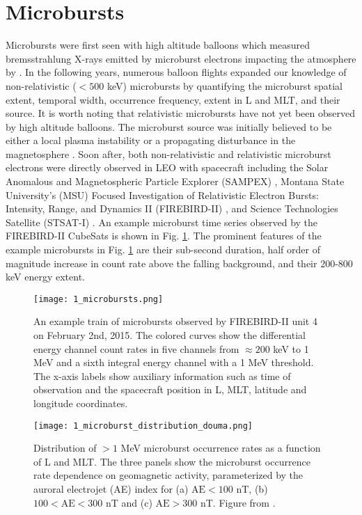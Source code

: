 \section{Microbursts}\label{Intro:microbursts}
Microbursts were first seen with high altitude balloons which measured bremsstrahlung X-rays emitted by microburst electrons impacting the atmosphere by \citet{Anderson1964}. In the following years, numerous balloon flights expanded our knowledge of non-relativistic ($< 500$ keV) microbursts by quantifying the microburst spatial extent, temporal width, occurrence frequency, extent in L and MLT, and their source. It is worth noting that relativistic microbursts have not yet been observed by high altitude balloons. The microburst source was initially believed to be either a local plasma instability or a propagating disturbance in the magnetosphere \citep{Trefall1966, Brown1965_2, Barcus1966, Parks1967}. Soon after, both non-relativistic and relativistic microburst electrons were directly observed in LEO with spacecraft including the Solar Anomalous and Magnetospheric Particle Explorer (SAMPEX) \citep[e.g.][]{Blake1996, Blum2015, Lorentzen2001a, Lorentzen2001b, Nakamura1995, Nakamura2000, O'Brien2003, O'Brien2004, Greeley2019, Douma2017, Douma2019},  Montana State University's (MSU) Focused Investigation of Relativistic Electron Bursts: Intensity, Range, and Dynamics II (FIREBIRD-II) \citep{Spence2012, Klumpar2015, Crew2016, Anderson2017, Breneman2017}, and Science Technologies Satellite (STSAT-I) \citep[e.g.][]{Lee2005, Lee2012}. An example microburst time series observed by the FIREBIRD-II CubeSats is shown in Fig. \ref{Intro:microbursts}. The prominent features of the example microbursts in Fig. \ref{Intro:microbursts} are their sub-second duration, half order of magnitude increase in count rate above the falling background, and their 200-800 keV energy extent.

\begin{figure}
\texttt{[image: 1\_microbursts.png]}
\caption{An example train of microbursts observed by FIREBIRD-II unit 4 on February 2nd, 2015. The colored curves show the differential energy channel count rates in five channels from $\approx 200$ keV to 1 MeV and a sixth integral energy channel with a 1 MeV threshold. The x-axis labels show auxiliary information such as time of observation and the spacecraft position in L, MLT, latitude and longitude coordinates.}
\label{Intro:microbursts}
\end{figure}

\begin{figure}
\texttt{[image: 1\_microburst\_distribution\_douma.png]}
\caption{Distribution of $> 1$ MeV microburst occurrence rates as a function of L and MLT. The three panels show the microburst occurrence rate dependence on geomagnetic activity, parameterized by the auroral electrojet (AE) index for (a) $\mathrm{AE} < 100$ nT, (b) $100 < \mathrm{AE} < 300$ nT and (c) $\mathrm{AE} > 300$ nT. Figure from \citet{Douma2017}.}
\label{Intro:microburst_distribution}
\end{figure}

